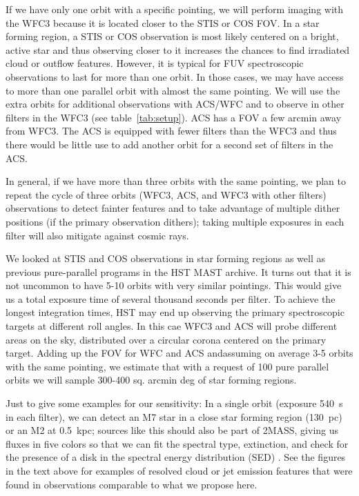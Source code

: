 \documentclass[12pt]{article}
\begin{document}
If we have only one orbit with a specific pointing, we will perform imaging with the WFC3 because it is located closer to the STIS or COS FOV. In a star forming region, a STIS or COS observation is most likely centered on a bright, active star and thus observing closer to it increases the chances to find irradiated cloud or outflow features. However,
it is typical for FUV spectroscopic observations to last for more than one orbit. In those cases, we may have access to more than one parallel orbit with almost the same pointing. We will use the extra orbits for additional observations with ACS/WFC and to observe in other filters in the WFC3 (see table~\ref{tab:setup}). ACS has a FOV a few arcmin away from WFC3. The ACS is equipped with fewer filters than the WFC3 and thus there would be little use to add another orbit for a second set of filters in the ACS.

In general, if we have more than three orbits with the same pointing, we plan to repeat the cycle of three orbits (WFC3, ACS, and WFC3 with other filters) observations to detect fainter features and to take advantage of multiple dither positions (if the primary observation dithers); taking multiple exposures in each filter will also mitigate against cosmic rays. 

We looked at STIS and COS observations in star forming regions as well as previous pure-parallel programs in the HST MAST archive. It turns out that it is not uncommon to have 5-10 orbits with very similar pointings. This would give us a total exposure time of several thousand seconds per filter. To achieve the longest integration times, HST may end up observing the primary spectroscopic targets at different roll angles. In this cae WFC3 and ACS will probe different areas on the sky, distributed over a circular corona centered on the primary target. Adding up the FOV for WFC and ACS andassuming on average 3-5 orbits with the same pointing, we estimate that with a request of 100 pure parallel orbits we will sample 300-400 sq. arcmin deg of star forming regions.%

Just to give some examples for our sensitivity: In a single orbit (exposure 540~s in each filter), we can detect an M7 star in a close star forming region (130~pc) or an M2 at 0.5~kpc; sources like this should also be part of 2MASS, giving us fluxes in five colors so that we can fit the spectral type, extinction, and check for the presence of a disk in the spectral energy distribution (SED) \citep{2007ApJS..169..328R}.
See the figures in the text above for examples of resolved cloud or jet emission features that were found in observations comparable to what we propose here.
\end{document}
